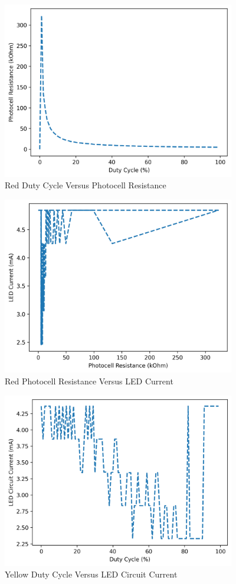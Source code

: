 \documentclass[12pt,titlepage]{article}
\begin{document}
\begin{figure}[!htb]
\centering
\includegraphics[width=4in]{lab_4/red_duty_cycle_photo_res.png}
\caption{Red Duty Cycle Versus Photocell Resistance}
\end{figure}
\begin{figure}[!htb]
  \centering
  \includegraphics[width=4in]{lab_4/red_photo_res_led_curr.png}
  \caption{Red Photocell Resistance Versus LED Current}
\end{figure}
\begin{figure}[!htb]
  \centering
  \includegraphics[width=4in]{lab_4/yellow_duty_cycle_led_circuit_curr.png}
  \caption{Yellow Duty Cycle Versus LED Circuit Current}
\end{figure}
\end{document}
